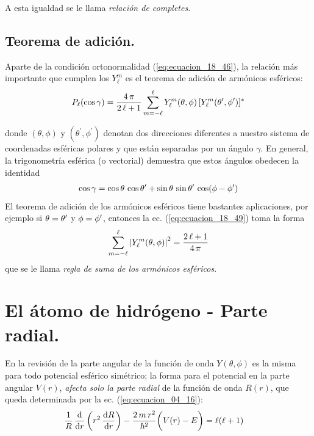 A esta igualdad se le llama \emph{relación de completes}.

\subsection{Teorema de adición.}

Aparte de la condición ortonormalidad (\ref{eq:ecuacion_18_46}), la relación más importante que cumplen los $Y_{\ell}^{m}$ es el teorema de adición de armónicos esféricos:
\begin{align}
P_{\ell} (\cos \gamma) = \dfrac{4 \, \pi}{2 \, \ell + 1} \sum_{m = -\ell}^{\ell} Y_{\ell}^{m} (\theta, \phi) \, [ Y_{\ell}^{m} (\theta^{\prime}, {\phi}^{\prime})]^{*}
\label{eq:ecuacion_18_49}
\end{align}

donde $(\theta, \phi)$ y $(\theta^{\prime}, \phi^{\prime})$ denotan dos direcciones diferentes a nuestro sistema de coordenadas esféricas polares y que están separadas por un ángulo $\gamma$. En general, la trigonometría esférica (o vectorial) demuestra que estos ángulos obedecen la identidad
\begin{align}
\cos \gamma = \cos \theta \, \cos {\theta}^{\prime} + \sin \theta \, \sin {\theta}^{\prime} \, \cos (\phi - {\phi}^{\prime})
\label{eq:ecuacion_18_50}
\end{align}
El teorema de adición de los armónicos esféricos tiene bastantes aplicaciones, por ejemplo si $\theta = {\theta}^{\prime}$ y $\phi = {\phi}^{\prime}$, entonces la ec. (\ref{eq:ecuacion_18_49}) toma la forma
\begin{align}
\sum_{m = -\ell}^{\ell} \abs{Y_{\ell}^{m} (\theta, \phi)}^{2} = \dfrac{2 \, \ell + 1}{4 \, \pi}
\label{eq:ecuacion_10_262}
\end{align}
que se le llama \emph{regla de suma de los armónicos esféricos}.


\section{El átomo de hidrógeno - Parte radial.}

 En la revisión de la parte angular de la función de onda $Y(\theta, \phi)$ es la misma para todo potencial esférico simétrico; la forma para el potencial en la parte angular $V(r)$, \emph{afecta solo la parte radial} de la función de onda $R(r)$, que queda determinada por la ec. (\ref{eq:ecuacion_04_16}):
\begin{align*}
\dfrac{1}{R} \, \dv{r} \left( r^{2} \, \dv{R}{r} \right) - \dfrac{2 \, m \, r^{2}}{\hbar^{2}} \bigg( V(r) - E \bigg) &= \ell (\ell + 1)
\end{align*}


